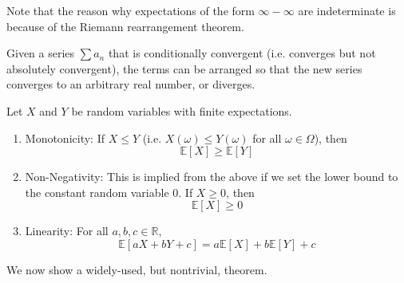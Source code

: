 \documentclass{article}
\begin{document}
    Note that the reason why expectations of the form $\infty - \infty$ are indeterminate is because of the Riemann rearrangement theorem. 

    \begin{theorem}
      Given a series $\sum a_n$ that is conditionally convergent (i.e. converges but not absolutely convergent), the terms can be arranged so that the new series converges to an arbitrary real number, or diverges. 
    \end{theorem}

    \begin{lemma}
      Let $X$ and $Y$ be random variables with finite expectations. 
      \begin{enumerate}
        \item Monotonicity: If $X \leq Y$ (i.e. $X(\omega) \leq Y(\omega)$ for all $\omega \in \Omega$), then 
        \begin{equation}
          \mathbb{E}[X] \geq \mathbb{E}[Y]
        \end{equation}
        
        \item Non-Negativity: This is implied from the above if we set the lower bound to the constant random variable $0$. If $X \geq 0$, then 
        \begin{equation}
          \mathbb{E}[X] \geq 0
        \end{equation}
        
        \item Linearity: For all $a, b, c \in \mathbb{R}$, 
        \begin{equation}
          \mathbb{E}[a X + b Y + c] = a \mathbb{E}[X] + b \mathbb{E}[Y] + c
        \end{equation}
      \end{enumerate}
    \end{lemma}

    We now show a widely-used, but nontrivial, theorem. 
\end{document}

